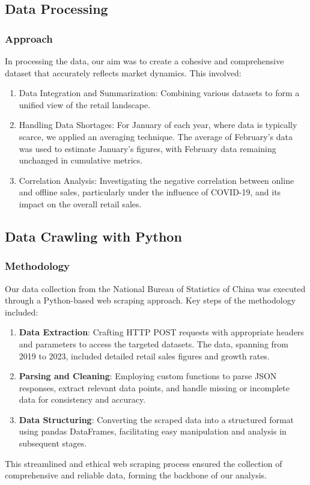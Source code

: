 \documentclass{article}
\begin{document}
\subsection*{Data Processing}

\subsubsection*{Approach}
In processing the data, our aim was to create a cohesive and comprehensive dataset that accurately reflects market dynamics. This involved:
\begin{enumerate}
    \item Data Integration and Summarization: Combining various datasets to form a unified view of the retail landscape.
    \item Handling Data Shortages: For January of each year, where data is typically scarce, we applied an averaging technique. The average of February's data was used to estimate January's figures, with February data remaining unchanged in cumulative metrics.
    \item Correlation Analysis: Investigating the negative correlation between online and offline sales, particularly under the influence of COVID-19, and its impact on the overall retail sales.
\end{enumerate}

\subsection*{Data Crawling with Python}


\subsubsection*{Methodology}
Our data collection from the National Bureau of Statistics of China was executed through a Python-based web scraping approach. Key steps of the methodology included:

\begin{enumerate}
    \item \textbf{Data Extraction}: Crafting HTTP POST requests with appropriate headers and parameters to access the targeted datasets. The data, spanning from 2019 to 2023, included detailed retail sales figures and growth rates.
    \item \textbf{Parsing and Cleaning}: Employing custom functions to parse JSON responses, extract relevant data points, and handle missing or incomplete data for consistency and accuracy.
    \item \textbf{Data Structuring}: Converting the scraped data into a structured format using pandas DataFrames, facilitating easy manipulation and analysis in subsequent stages.
\end{enumerate}
This streamlined and ethical web scraping process ensured the collection of comprehensive and reliable data, forming the backbone of our analysis.
\end{document}

